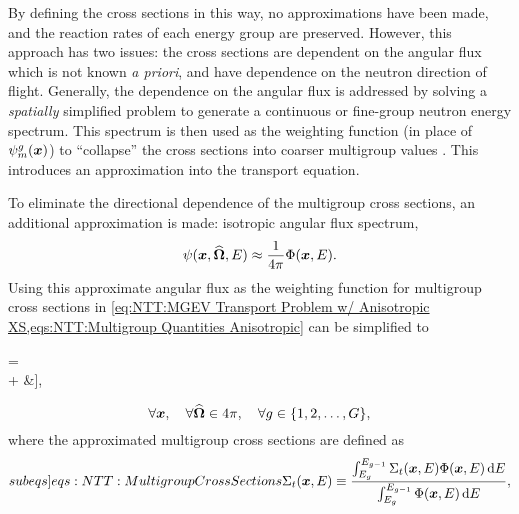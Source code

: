 {{{{                By defining the cross sections in this way, no approximations have been made, and the reaction rates of each energy group are preserved.
                However, this approach has two issues: the cross sections are dependent on the angular flux which is not known \textit{a priori}, and have dependence on the neutron direction of flight.
                Generally, the dependence on the angular flux is addressed by solving a \emph{spatially} simplified problem to generate a continuous or fine-group neutron energy spectrum.
                This spectrum is then used as the weighting function (in place of $\aflux$) to ``collapse'' the cross sections into coarser multigroup values \cite{Knott2010}.
                This introduces an approximation into the transport equation.

                To eliminate the directional dependence of the multigroup cross sections, an additional approximation is made: isotropic angular flux spectrum,
                \begin{equation}\label{eq:NTT:Multigroup Isotropic Spectrum}
                    \psi(\boldsymbol{x},\boldsymbol{\widehat{\Omega}},E) \approx \frac{1}{4\pi}\Phi(\boldsymbol{x}, E).
                \end{equation}
                Using this approximate angular flux as the weighting function for multigroup cross sections in \cref{eq:NTT:MGEV Transport Problem w/ Anisotropic XS,eqs:NTT:Multigroup Quantities Anisotropic} can be simplified to
                \begin{aequation}\label{eq:NTT:MGEV Transport Problem}
                    \left[\dir\vdot\grad + \xst\right]\aflux = \rfourpi\Bigg[&\suml[\gprime=1][G]\intl[\fourpi]\xss\aflux[\loc][\dirprime][\gprime]\ddirprime\\
                        + \frac{\spect}{\keff}&\suml[\gprime=1][G]\nufis\intl[\fourpi]\aflux[\loc][\dirprime][\gprime]\ddirprime\Bigg],
                \end{aequation}
                \begin{equation*}
                    \forall\boldsymbol{x}, \quad \forall\boldsymbol{\widehat{\Omega}}\in4\pi,\quad \forall g\in\{1,2,\ldots,G\},
                \end{equation*}
                where the approximated multigroup cross sections are defined as
                \begin{subequations}\label[subeqs]{eqs:NTT:Multigroup Cross Sections}
                    \begin{equation}\label{eq:NTT:Multigroup Total Cross Section}
                        \xst \defined \frac{\intl[E_{g}][E_{g-1}]\CrossSection_{t}(\loc,E)\FluxSpectrum(\loc,E)\dif{E}}{\intl[E_{g}][E_{g-1}]\FluxSpectrum(\loc,E)\dif{E}},

\end{equation}
\end{subequations}}}}}
